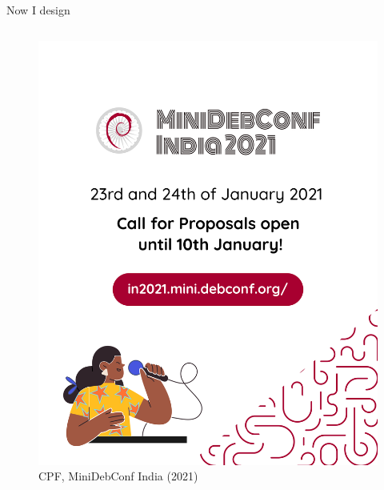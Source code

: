 \documentclass[presentation]{beamer}
\begin{document}
\begin{frame}[label={sec:orgaf4c7a7}]{Now I design}
\begin{columns}
\begin{column}{0.25\columnwidth}
\begin{figure}[htbp]
\includegraphics[width=.9\linewidth]{././cpfdraft.png}
\caption{CPF, MiniDebConf India (2021)}
\end{figure}
\end{column}
\end{columns}
\end{frame}
\end{document}
